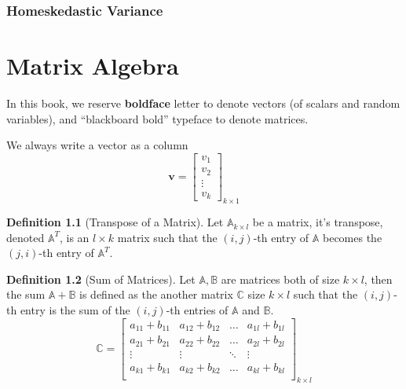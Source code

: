 \documentclass[
]{book}
\theoremstyle{definition}
\newtheorem{definition}{Definition}[chapter]
\theoremstyle{definition}
\theoremstyle{definition}
\theoremstyle{definition}
\theoremstyle{remark}
\begin{document}
\hypertarget{homeskedastic-variance}{%
\subsection{Homeskedastic Variance}\label{homeskedastic-variance}}

\hypertarget{appendix-appendix}{%
\appendix}


\hypertarget{matrix-algebra}{%
\chapter{Matrix Algebra}\label{matrix-algebra}}

In this book, we reserve \textbf{boldface} letter to denote vectors (of scalars and random variables), and ``blackboard bold'' typeface to denote matrices.

We always write a vector as a column
\[
\pmb{v}=\begin{bmatrix}
v_1 \\
v_2 \\
\vdots \\
v_k
\end{bmatrix}_{k\times1}
\]

\begin{definition}[Transpose of a Matrix]
\protect\hypertarget{def:mattrans}{}\label{def:mattrans}Let \(\mathbb{A}_{k\times l}\) be a matrix, it's transpose, denoted \(\mathbb{A}^T\), is an \(l\times k\) matrix such that
the \((i,j)\)-th entry of \(\mathbb{A}\) becomes the \((j,i)\)-th entry of \(\mathbb{A}^T\).
\end{definition}

\begin{definition}[Sum of Matrices]
\protect\hypertarget{def:matsum}{}\label{def:matsum}Let \(\mathbb{A},\mathbb{B}\) are matrices both of size \(k\times l\), then the sum \(\mathbb{A}+\mathbb{B}\) is defined as the another matrix \(\mathbb{C}\) size \(k\times l\) such that the \((i,j)\)-th entry is the sum of the \((i,j)\)-th entries of \(\mathbb A\) and \(\mathbb B\).
\[
  \mathbb{C}=\begin{bmatrix}
  a_{11}+b_{11} & a_{12}+b_{12} & \ldots & a_{1l}+b_{1l} \\
  a_{21}+b_{21} & a_{22}+b_{22} & \ldots & a_{2l}+b_{2l} \\
  \vdots & \vdots & \ddots & \vdots \\
  a_{k1}+b_{k1} & a_{k2}+b_{k2} & \ldots & a_{kl}+b_{kl} \\
  \end{bmatrix}_{k\times l}
  \]
\end{definition}
\end{document}
